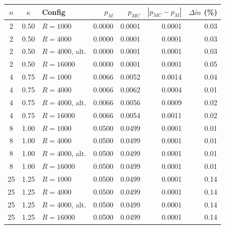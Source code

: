 \begin{tabular}{cclrrrr}
\toprule
$n$ & $\kappa$ & Config & $p_M$ & $p_{MC}$ & $|p_{MC}-p_M|$ & $\Delta \widetilde{m}$ (\%) \\
\midrule
2 & 0.50 & $R=1000$ & 0.0000 & 0.0001 & 0.0001 & 0.03 \\
2 & 0.50 & $R=4000$ & 0.0000 & 0.0001 & 0.0001 & 0.03 \\
2 & 0.50 & $R=4000$, alt. & 0.0000 & 0.0001 & 0.0001 & 0.03 \\
2 & 0.50 & $R=16000$ & 0.0000 & 0.0001 & 0.0001 & 0.05 \\
\midrule
4 & 0.75 & $R=1000$ & 0.0066 & 0.0052 & 0.0014 & 0.04 \\
4 & 0.75 & $R=4000$ & 0.0066 & 0.0062 & 0.0004 & 0.01 \\
4 & 0.75 & $R=4000$, alt. & 0.0066 & 0.0056 & 0.0009 & 0.02 \\
4 & 0.75 & $R=16000$ & 0.0066 & 0.0054 & 0.0011 & 0.02 \\
\midrule
8 & 1.00 & $R=1000$ & 0.0500 & 0.0499 & 0.0001 & 0.01 \\
8 & 1.00 & $R=4000$ & 0.0500 & 0.0499 & 0.0001 & 0.01 \\
8 & 1.00 & $R=4000$, alt. & 0.0500 & 0.0499 & 0.0001 & 0.01 \\
8 & 1.00 & $R=16000$ & 0.0500 & 0.0499 & 0.0001 & 0.01 \\
\midrule
25 & 1.25 & $R=1000$ & 0.0500 & 0.0499 & 0.0001 & 0.14 \\
25 & 1.25 & $R=4000$ & 0.0500 & 0.0499 & 0.0001 & 0.14 \\
25 & 1.25 & $R=4000$, alt. & 0.0500 & 0.0499 & 0.0001 & 0.14 \\
25 & 1.25 & $R=16000$ & 0.0500 & 0.0499 & 0.0001 & 0.14 \\
\bottomrule
\end{tabular}
